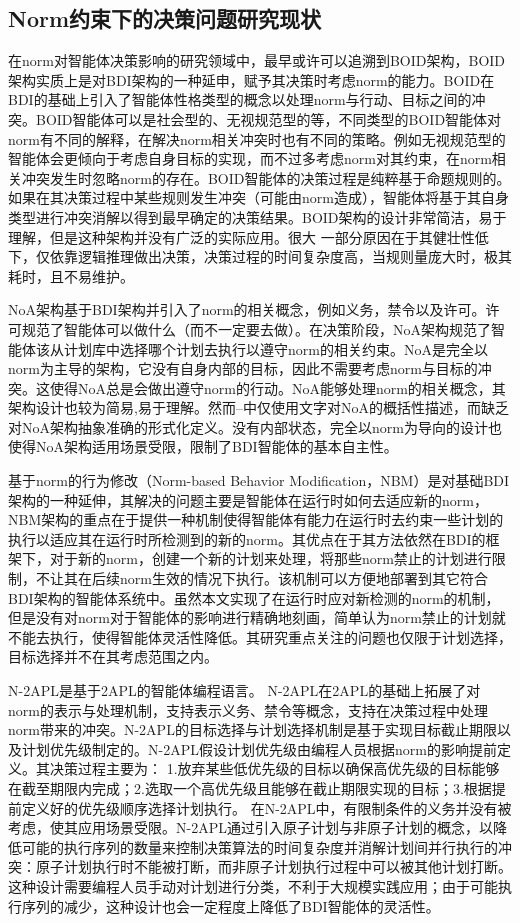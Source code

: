 \subsection{Norm约束下的决策问题研究现状}
在norm对智能体决策影响的研究领域中，最早或许可以追溯到BOID架构\cite{DBLP:conf/agents/BroersenDHHT01}，BOID架构实质上是对BDI架构的一种延申，赋予其决策时考虑norm的能力。BOID在BDI的基础上引入了智能体性格类型的概念以处理norm与行动、目标之间的冲突。BOID智能体可以是社会型的、无视规范型的等，不同类型的BOID智能体对norm有不同的解释，在解决norm相关冲突时也有不同的策略。例如无视规范型的智能体会更倾向于考虑自身目标的实现，而不过多考虑norm对其约束，在norm相关冲突发生时忽略norm的存在。BOID智能体的决策过程是纯粹基于命题规则的。如果在其决策过程中某些规则发生冲突（可能由norm造成），智能体将基于其自身类型进行冲突消解以得到最早确定的决策结果。BOID架构的设计非常简洁，易于理解，但是这种架构并没有广泛的实际应用。很大 一部分原因在于其健壮性低下，仅依靠逻辑推理做出决策，决策过程的时间复杂度高，当规则量庞大时，极其耗时，且不易维护。

NoA\cite{DBLP:conf/ijcai/KollingbaumN03}架构基于BDI架构并引入了norm的相关概念，例如义务，禁令以及许可。许可规范了智能体可以做什么（而不一定要去做）。在决策阶段，NoA架构规范了智能体该从计划库中选择哪个计划去执行以遵守norm的相关约束。NoA是完全以norm为主导的架构，它没有自身内部的目标，因此不需要考虑norm与目标的冲突。这使得NoA总是会做出遵守norm的行动。NoA能够处理norm的相关概念，其架构设计也较为简易,易于理解。然而--中仅使用文字对NoA的概括性描述，而缺乏对NoA架构抽象准确的形式化定义。没有内部状态，完全以norm为导向的设计也使得NoA架构适用场景受限，限制了BDI智能体的基本自主性。


基于norm的行为修改（Norm-based Behavior Modification，NBM）\cite{DBLP:conf/atal/MeneguzziL09}是对基础BDI架构的一种延伸，其解决的问题主要是智能体在运行时如何去适应新的norm，NBM架构的重点在于提供一种机制使得智能体有能力在运行时去约束一些计划的执行以适应其在运行时所检测到的新的norm。其优点在于其方法依然在BDI的框架下，对于新的norm，创建一个新的计划来处理，将那些norm禁止的计划进行限制，不让其在后续norm生效的情况下执行。该机制可以方便地部署到其它符合BDI架构的智能体系统中。虽然本文实现了在运行时应对新检测的norm的机制，但是没有对norm对于智能体的影响进行精确地刻画，简单认为norm禁止的计划就不能去执行，使得智能体灵活性降低。其研究重点关注的问题也仅限于计划选择，目标选择并不在其考虑范围之内。

N-2APL\cite{DBLP:conf/aamas/AlechinaDL12}是基于2APL\cite{DBLP:journals/aamas/Dastani08}的智能体编程语言。 N-2APL在2APL的基础上拓展了对norm的表示与处理机制，支持表示义务、禁令等概念，支持在决策过程中处理norm带来的冲突。N-2APL的目标选择与计划选择机制是基于实现目标截止期限以及计划优先级制定的。N-2APL假设计划优先级由编程人员根据norm的影响提前定义。其决策过程主要为： 1.放弃某些低优先级的目标以确保高优先级的目标能够在截至期限内完成；2.选取一个高优先级且能够在截止期限实现的目标；3.根据提前定义好的优先级顺序选择计划执行。
在N-2APL中，有限制条件的义务并没有被考虑，使其应用场景受限。N-2APL通过引入原子计划与非原子计划的概念，以降低可能的执行序列的数量来控制决策算法的时间复杂度并消解计划间并行执行的冲突：原子计划执行时不能被打断，而非原子计划执行过程中可以被其他计划打断。这种设计需要编程人员手动对计划进行分类，不利于大规模实践应用；由于可能执行序列的减少，这种设计也会一定程度上降低了BDI智能体的灵活性。

